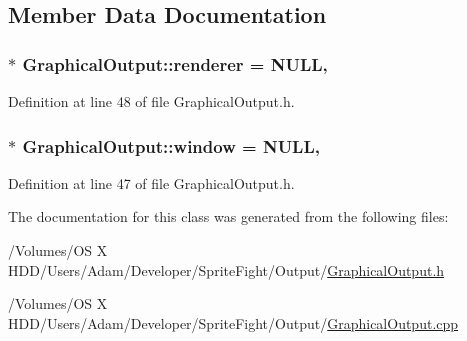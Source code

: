 \subsection{Member Data Documentation}
\hypertarget{class_graphical_output_a0c3e8f71b53de8e424cea3c15b3c28a0}{
\subsubsection[{renderer}]{ $\ast$ Graphical\-Output\-::renderer = N\-U\-L\-L\hspace{0.3cm}{\ttfamily [static]}, {\ttfamily [protected]}}}\label{class_graphical_output_a0c3e8f71b53de8e424cea3c15b3c28a0}


Definition at line 48 of file Graphical\-Output.\-h.

\hypertarget{class_graphical_output_a7ec322f6e170a81b22159e766774a0b8}{
\subsubsection[{window}]{ $\ast$ Graphical\-Output\-::window = N\-U\-L\-L\hspace{0.3cm}{\ttfamily [static]}, {\ttfamily [protected]}}}\label{class_graphical_output_a7ec322f6e170a81b22159e766774a0b8}


Definition at line 47 of file Graphical\-Output.\-h.



The documentation for this class was generated from the following files\-:\begin{DoxyCompactItemize}
\item 
/\-Volumes/\-O\-S X H\-D\-D/\-Users/\-Adam/\-Developer/\-Sprite\-Fight/\-Output/\hyperlink{_graphical_output_8h}{Graphical\-Output.\-h}\item 
/\-Volumes/\-O\-S X H\-D\-D/\-Users/\-Adam/\-Developer/\-Sprite\-Fight/\-Output/\hyperlink{_graphical_output_8cpp}{Graphical\-Output.\-cpp}\end{DoxyCompactItemize}
